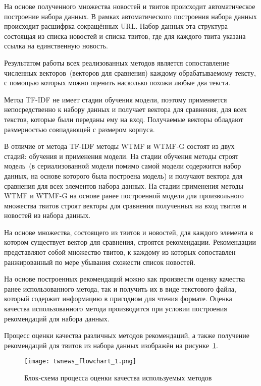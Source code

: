     На основе полученного множества новостей и твитов происходит автоматическое построение набора данных. В рамках автоматического построения набора данных происходит расшифрка сокращённых URL.
    Набор данных эта структура состоящая из списка новостей и списка твитов, где для каждого твита указана ссылка на единственную новость.

    Результатом работы всех реализованных методов является сопоставление численных векторов~(векторов для сравнения) каждому обрабатываемому тексту, с помощью которых можно оценить насколько похожи любые два текста. 

    Метод TF-IDF не имеет стадии обучения модели, поэтому применяется непосредственно к набору данных и получает вектора для сравнения, для всех текстов, которые были переданы ему на вход.
    Получаемые векторы обладают размерностью совпадающей с размером корпуса.

    В отличие от метода TF-IDF методы WTMF и WTMF-G состоят из двух стадий: обучения и применения модели. На стадии обучения методы строят модель~(в сериализованной модели помимо самой модели содержится набор данных, на основе которого была построена модель) и получают вектора для сравнения для всех элементов набора данных. На стадии применения методы WTMF и WTMF-G на основе ранее построенной модели для произвольного множества твитов строят векторы для сравнения полученных на вход твитов и новостей из набора данных.

    На основе множества, состоящего из твитов и новостей, для каждого элемента в котором существует вектор для сравнения, строятся рекомендации.
    Рекомендации представляют собой множество твитов, к каждому из которых сопоставлен ранжированный по мере убывания схожести список новостей.

    На основе построенных рекомендаций можно как произвести оценку качества ранее использованного метода, так и получить их в виде текстового файла,
    который содержит информацию в пригодном для чтения формате.
    Оценка качества использованного метода производится при условии построения рекомендаций для набора данных.

    Процесс оценки качества различных методов рекомендаций, а также получение рекомендаций для твитов из набора данных изображён на рисунке~\ref{pic:twnews_flowchart_1}.

    \begin{figure}[h!]
            \center
            \texttt{[image: twnews\_flowchart\_1.png]}
            \caption{Блок-схема процесса оценки качества используемых методов}
            \label{pic:twnews_flowchart_1}
    \end{figure}

